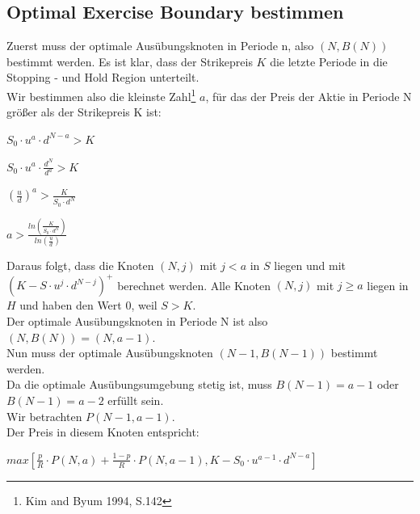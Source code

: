 \documentclass[12pt,a4paper]{article}
\begin{document}
\begin{text}
\section{}
\subsection{Optimal Exercise Boundary bestimmen}
Zuerst muss der optimale Ausübungsknoten in Periode n, also $(N,B(N))$ bestimmt werden. Es ist klar, dass der Strikepreis $K$ die letzte Periode in die Stopping - und Hold Region unterteilt.
\\
Wir bestimmen also die kleinste Zahl\footnote[3]{Kim and Byum 1994, S.142}  $a$, für das der Preis der Aktie in Periode N größer als der Strikepreis K ist:
\\
\begin{center}
    $S_0\cdot u^a \cdot d^{N-a} > K$
\end{center}

\begin{center}
    $S_0 \cdot u^a \cdot \frac{d^N}{d^a} > K$
\end{center}

\begin{center}
    $\left(\frac{u}{d}\right)^a > \frac{K}{S_0 \cdot d^N}$
\end{center}

\begin{center}
    $a > \frac{ln(\frac{K}{S_0 \cdot d^N})}{ln(\frac{u}{d})}$
\end{center}


Daraus folgt, dass die Knoten $(N,j)$ mit $j < a$ in $S$ liegen und mit 
\\ $(K - S \cdot u^j \cdot d^{N-j})^+$ berechnet werden. Alle Knoten $(N,j)$ mit $j \geq a$ liegen in $H$ und haben den Wert 0, weil $S>K$.
\\
Der optimale Ausübungsknoten in Periode N ist also $(N,B(N)) = (N,a-1)$.
\\
Nun muss der optimale Ausübungsknoten $(N-1,B(N-1))$ bestimmt werden.
\\
Da die optimale Ausübungsumgebung stetig ist, muss $B(N-1) = a-1$ oder $B(N-1) = a-2$ erfüllt sein.
\\
Wir betrachten $P(N-1,a-1)$.
\\
Der Preis in diesem Knoten entspricht:
\begin{center}
    $max[\frac{p}{R} \cdot P(N,a) + \frac{1-p}{R} \cdot P(N,a-1), K - S_0\cdot u^{a-1} \cdot d^{N-a}]$ 
\end{center}


\end{text}
\end{document}
